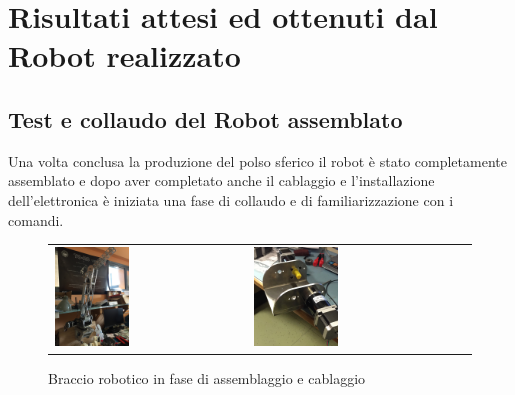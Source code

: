 \documentclass[%
corpo=11pt,
twoside,
 stile=classica,
oldstyle,
greek,%
]{toptesi}
\begin{document}
\chapter{Risultati attesi ed ottenuti dal Robot realizzato}
	\section{Test e collaudo del Robot assemblato}
	Una volta conclusa la produzione del polso sferico il robot è stato completamente assemblato e dopo aver completato anche il cablaggio e l'installazione dell'elettronica è iniziata una fase di collaudo e di familiarizzazione con i comandi. 
	\begin{figure}
		\centering
		\begin{tabular}{ll}
		\includegraphics[width=0.4\textwidth]{image/armfoto.jpg}
		&
		\includegraphics[width=0.4\textwidth]{image/baseass.jpg}
		\end{tabular}
		\caption{Braccio robotico in fase di assemblaggio e cablaggio}
		\label{fig:ass1}
	\end{figure}
\end{document}
